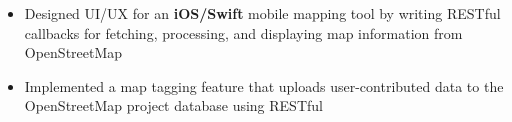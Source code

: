 \begin{itemize}[leftmargin=0pt, label={}]
{    \vspace{-6pt}
    \begin{itemize}[label=\textbullet, leftmargin=*, noitemsep]%
        \item{Designed UI/UX for an \textbf{iOS/Swift} mobile mapping tool by writing RESTful callbacks for fetching, processing, and displaying map information from OpenStreetMap}
        \item{Implemented a map tagging feature that uploads user-contributed data to the OpenStreetMap project database using RESTful}
    \end{itemize}
}
\end{itemize}
